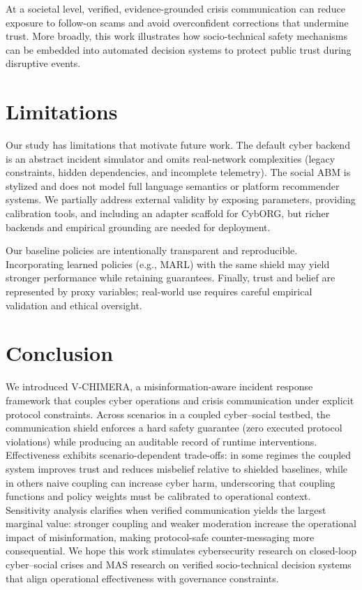 \documentclass[referee,lineno,sn-basic]{sn-jnl}
\newcommand{\model}{V-CHIMERA}
\begin{document}
At a societal level, verified, evidence-grounded crisis communication can reduce exposure to follow-on scams and avoid overconfident corrections that undermine trust. More broadly, this work illustrates how socio-technical safety mechanisms can be embedded into automated decision systems to protect public trust during disruptive events.

\section{Limitations}
Our study has limitations that motivate future work. The default cyber backend is an abstract incident simulator and omits real-network complexities (legacy constraints, hidden dependencies, and incomplete telemetry). The social ABM is stylized and does not model full language semantics or platform recommender systems. We partially address external validity by exposing parameters, providing calibration tools, and including an adapter scaffold for CybORG, but richer backends and empirical grounding are needed for deployment.

Our baseline policies are intentionally transparent and reproducible. Incorporating learned policies (e.g., MARL) with the same shield may yield stronger performance while retaining guarantees. Finally, trust and belief are represented by proxy variables; real-world use requires careful empirical validation and ethical oversight.

\section{Conclusion}
We introduced \model{}, a misinformation-aware incident response framework that couples cyber operations and crisis communication under explicit protocol constraints. Across scenarios in a coupled cyber--social testbed, the communication shield enforces a hard safety guarantee (zero executed protocol violations) while producing an auditable record of runtime interventions. Effectiveness exhibits scenario-dependent trade-offs: in some regimes the coupled system improves trust and reduces misbelief relative to shielded baselines, while in others naive coupling can increase cyber harm, underscoring that coupling functions and policy weights must be calibrated to operational context. Sensitivity analysis clarifies when verified communication yields the largest marginal value: stronger coupling and weaker moderation increase the operational impact of misinformation, making protocol-safe counter-messaging more consequential. We hope this work stimulates cybersecurity research on closed-loop cyber--social crises and MAS research on verified socio-technical decision systems that align operational effectiveness with governance constraints.
\end{document}
